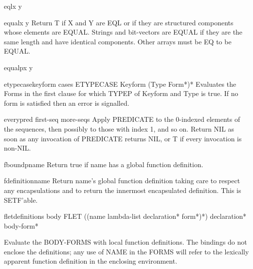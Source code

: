 \begin{function}{eql}{x y}{}
  
\end{function}

\begin{function}{equal}{x y}{}
  Return T if X and Y are EQL or if they are structured components whose
elements are EQUAL. Strings and bit-vectors are EQUAL if they are the same
length and have identical components. Other arrays must be EQ to be EQUAL.
\end{function}

\begin{function}{equalp}{x y}{}
  
\end{function}

\begin{macro}{etypecase}{keyform \body cases}{}
  ETYPECASE Keyform {(Type Form*)}*
  Evaluates the Forms in the first clause for which TYPEP of Keyform and Type
  is true. If no form is satisfied then an error is signalled.
\end{macro}

\begin{function}{every}{pred first-seq \rest more-seqs}{}
  Apply PREDICATE to the 0-indexed elements of the sequences, then
   possibly to those with index 1, and so on. Return NIL as soon
   as any invocation of PREDICATE returns NIL, or T if every invocation
   is non-NIL.
\end{function}

\begin{function}{fboundp}{name}{}
  Return true if name has a global function definition.
\end{function}

\begin{accessor}{fdefinition}{name}{}
  Return name's global function definition taking care to respect any
   encapsulations and to return the innermost encapsulated definition.
   This is SETF'able.
\end{accessor}

\begin{specialop}{flet}{definitions \body body}{}
  FLET ({(name lambda-list declaration* form*)}*) declaration* body-form*

Evaluate the BODY-FORMS with local function definitions. The bindings do
not enclose the definitions; any use of NAME in the FORMS will refer to the
lexically apparent function definition in the enclosing environment.
\end{specialop}

